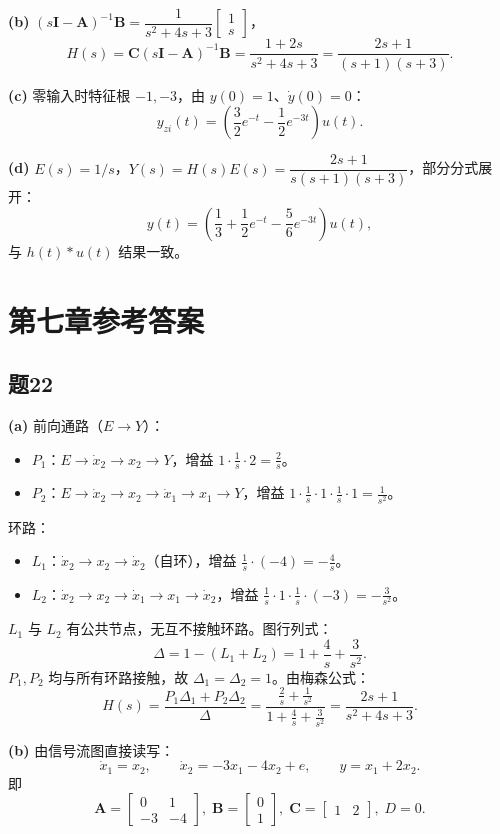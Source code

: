 \documentclass[11pt,a4paper]{ctexart}
\begin{document}
\textbf{(b)} $(s\mathbf{I}-\mathbf{A})^{-1}\mathbf{B}=\dfrac{1}{s^2+4s+3}\begin{bmatrix}1\\ s\end{bmatrix}$，
\[
H(s)=\mathbf{C}(s\mathbf{I}-\mathbf{A})^{-1}\mathbf{B}=\frac{1+2s}{s^2+4s+3}=\frac{2s+1}{(s+1)(s+3)}.
\]

\textbf{(c)} 零输入时特征根 $-1,-3$，由 $y(0)=1$、$\dot y(0)=0$：
\[
y_{zi}(t)=\left(\frac{3}{2}e^{-t}-\frac{1}{2}e^{-3t}\right)u(t).
\]

\textbf{(d)} $E(s)=1/s$，$Y(s)=H(s)E(s)=\dfrac{2s+1}{s(s+1)(s+3)}$，部分分式展开：
\[
y(t)=\left(\frac{1}{3}+\frac{1}{2}e^{-t}-\frac{5}{6}e^{-3t}\right)u(t),
\]
与 $h(t)*u(t)$ 结果一致。

\section{第七章参考答案}

\subsection*{题22}

\textbf{(a)} 前向通路（$E\to Y$）：
\begin{itemize}
    \item $P_1$：$E\to\dot x_2\to x_2\to Y$，增益 $1\cdot\frac{1}{s}\cdot 2=\frac{2}{s}$。
    \item $P_2$：$E\to\dot x_2\to x_2\to\dot x_1\to x_1\to Y$，增益 $1\cdot\frac{1}{s}\cdot 1\cdot\frac{1}{s}\cdot 1=\frac{1}{s^2}$。
\end{itemize}
环路：
\begin{itemize}
    \item $L_1$：$\dot x_2\to x_2\to\dot x_2$（自环），增益 $\frac{1}{s}\cdot(-4)=-\frac{4}{s}$。
    \item $L_2$：$\dot x_2\to x_2\to\dot x_1\to x_1\to\dot x_2$，增益 $\frac{1}{s}\cdot 1\cdot\frac{1}{s}\cdot(-3)=-\frac{3}{s^2}$。
\end{itemize}
$L_1$ 与 $L_2$ 有公共节点，无互不接触环路。图行列式：
\[
\Delta=1-(L_1+L_2)=1+\frac{4}{s}+\frac{3}{s^2}.
\]
$P_1,P_2$ 均与所有环路接触，故 $\Delta_1=\Delta_2=1$。由梅森公式：
\[
H(s)=\frac{P_1\Delta_1+P_2\Delta_2}{\Delta}
     =\frac{\frac{2}{s}+\frac{1}{s^2}}{1+\frac{4}{s}+\frac{3}{s^2}}
     =\frac{2s+1}{s^2+4s+3}.
\]

\textbf{(b)} 由信号流图直接读写：
\[
\dot x_1=x_2,\qquad
\dot x_2=-3x_1-4x_2+e,\qquad
y=x_1+2x_2.
\]
即
\[
\mathbf{A}=\begin{bmatrix}0&1\\-3&-4\end{bmatrix},\;
\mathbf{B}=\begin{bmatrix}0\\1\end{bmatrix},\;
\mathbf{C}=\begin{bmatrix}1&2\end{bmatrix},\;
D=0.
\]
\end{document}
